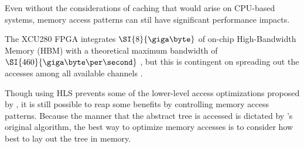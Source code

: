

Even without the considerations of caching that would arise on CPU-based
systems, memory access patterns can stil have significant performance impacts.

The XCU280 FPGA integrates $\SI{8}{\giga\byte}$ of on-chip High-Bandwidth Memory
(HBM) with a theoretical maximum bandwidth of $\SI{460}{\giga\byte\per\second}$
\autocite{u280}, but this is contingent on spreading out the accesses among all
available channels \autocite{holzinger-ipdpsw-2021}.

Though using HLS prevents some of the lower-level access optimizations proposed
by \citeauthor{holzinger-ipdpsw-2021}, it is still possible to reap some
benefits by controlling memory access patterns. Because the manner that the
abstract tree is accessed is dictated by \citeauthor{b-link}'s original
algorithm, the best way to optimize memory accesses is to consider how best to
lay out the tree in memory.
